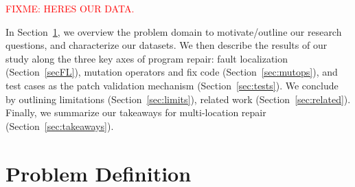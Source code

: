 \documentclass[10pt, conference]{IEEEtran}
\newcommand\todo[1]{\textcolor{red}{#1}}
\begin{document}
\todo{FIXME: HERES OUR DATA.}

In Section~\ref{sec:background}, we overview the problem domain to
motivate/outline our research questions, and characterize our datasets.
We then describe the results of our study along the
three key axes of program repair: fault localization (Section~\ref{secFL}),
mutation operators and fix code (Section~\ref{sec:mutops}), and test cases as
the patch validation mechanism (Section~\ref{sec:tests}).  We conclude by
outlining limitations (Section~\ref{sec:limits}), related work
(Section~\ref{sec:related}).  Finally, 
we summarize our takeaways for 
multi-location repair (Section~\ref{sec:takeaways}).

\section{Problem Definition}
\label{sec:background}
\end{document}
